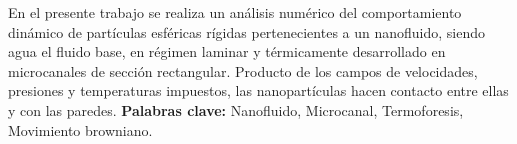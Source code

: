 \thispagestyle{fancy}
\vspace{5mm}
En el presente trabajo se realiza un análisis numérico del comportamiento dinámico de partículas esféricas rígidas pertenecientes a un nanofluido, siendo agua el fluido base, en régimen laminar y térmicamente desarrollado en microcanales de sección rectangular. Producto de los campos de velocidades, presiones y temperaturas impuestos, las nanopartículas hacen contacto entre ellas y con las paredes.
\vfill
\noindent\textbf{Palabras clave:} Nanofluido, Microcanal, Termoforesis, Movimiento browniano.
